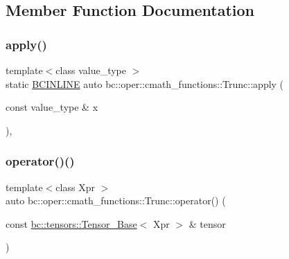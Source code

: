 \subsection{Member Function Documentation}
\mbox{\label{structbc_1_1oper_1_1cmath__functions_1_1Trunc_a4c10911defd4cda3b086b4f03048e59a}} 
\subsubsection{\texorpdfstring{apply()}{apply()}}
{\footnotesize\ttfamily template$<$class value\+\_\+type $>$ \\
static \hyperlink{common_8h_a6699e8b0449da5c0fafb878e59c1d4b1}{B\+C\+I\+N\+L\+I\+NE} auto bc\+::oper\+::cmath\+\_\+functions\+::\+Trunc\+::apply (\begin{DoxyParamCaption}\item[{const value\+\_\+type \&}]{x }\end{DoxyParamCaption})\hspace{0.3cm}{\ttfamily [inline]}, {\ttfamily [static]}}

\mbox{\label{structbc_1_1oper_1_1cmath__functions_1_1Trunc_a5db48ec44f2480f3e9db37b350b62a8b}} 
\subsubsection{\texorpdfstring{operator()()}{operator()()}\hspace{0.1cm}{\footnotesize\ttfamily [1/3]}}
{\footnotesize\ttfamily template$<$class Xpr $>$ \\
auto bc\+::oper\+::cmath\+\_\+functions\+::\+Trunc\+::operator() (\begin{DoxyParamCaption}\item[{const \hyperlink{classbc_1_1tensors_1_1Tensor__Base}{bc\+::tensors\+::\+Tensor\+\_\+\+Base}$<$ Xpr $>$ \&}]{tensor }\end{DoxyParamCaption})\hspace{0.3cm}{\ttfamily [inline]}}

